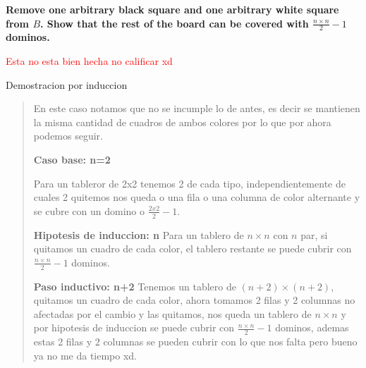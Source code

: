 \textbf{Remove one arbitrary black square and one arbitrary white square from $B$. Show that the rest of the board can be covered with $\frac{n \times n}{2}-1$ dominos.}\vspace{.2cm}

\textcolor{red}{Esta no esta bien hecha no calificar xd}

\textcolor{bibi}{Demostracion por induccion}
\begin{quote}
    En este caso notamos que no se incumple lo de antes, es decir se mantienen la misma cantidad de cuadros de ambos colores por lo que por ahora podemos seguir. \vspace{.2cm}

    \textbf{Caso base: n=2}

    Para un tableror de 2x2 tenemos 2 de cada tipo, independientemente de cuales 2 quitemos nos queda o una fila o una columna de color alternante y se cubre con un domino o $\frac{2x2}{2}-1$. \vspace{.2cm}

    \textbf{Hipotesis de induccion: n}
    Para un tablero de $n \times n$ con $n$ par, si quitamos un cuadro de cada color, el tablero restante se puede cubrir con $\frac{n \times n}{2}-1$ dominos. \vspace{.2cm}

    \textbf{Paso inductivo: n+2}
    Tenemos un tablero de $(n+2) \times (n+2)$, quitamos un cuadro de cada color, ahora tomamos 2 filas y 2 columnas no afectadas por el cambio y las quitamos, nos queda un tablero de $n \times n$ y por hipotesis de induccion se puede cubrir con $\frac{n \times n}{2}-1$ dominos, ademas estas 2 filas y 2 columnas se pueden cubrir con lo que nos falta pero bueno ya no me da tiempo xd. \vspace{.2cm}
\end{quote}